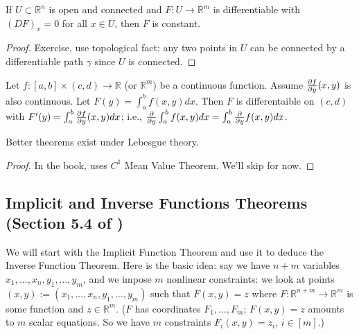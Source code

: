 \begin{theorem}

\end{theorem}

\begin{corollary}

If \(U \subset \mathbb{R}^n\) is open and connected and \(F: U \to \mathbb{R}^m\) is differentiable with \((DF)_x = 0\) for all \(x \in U\), then \(F\) is constant.

\end{corollary}

\begin{proof}

Exercise, use topological fact: any two points in \(U\) can be connected by a differentiable path \(\gamma\) since \(U\) is connected.

\end{proof}

\begin{theorem}

Let \(f: [a,b] \times (c,d) \to \mathbb{R}\) (or \(\mathbb{R}^m\)) be a continuous function. Assume \(\pderiv{f}{y}(x,y)\) is also continuous. Let \(F(y) = \int_a^b f(x,y) dx\). Then \(F\) is differentaible on \((c,d)\) with \(F'(y) = \int_a^b \pderiv{f}{y} (x,y) dx\); i.e., \(\pderiv{}{y} \int_a^b f(x,y) dx = \int_a^b \pderiv{}{y} f(x,y) dx\). 

\end{theorem}

\begin{remark}

Better theorems exist under Lebesgue theory.

\end{remark}

\begin{proof}

In the book, uses \(C^1\) Mean Value Theorem. We'll skip for now.

\end{proof}

\subsection{Implicit and Inverse Functions Theorems (Section 5.4 of \citet{pugh2015real})}\label{ra.5.4.pugh}

We will start with the Implicit Function Theorem and use it to deduce the Inverse Function Theorem. Here is the basic idea: say we have \(n + m\) variables \(x_1, \ldots, x_n, y_1, \ldots, y_m\), and we impose \(m\) nonlinear constraints: we look at points \((x,y) := (x_1, \ldots, x_n, y_1, \ldots, y_m)\) such that \(F(x,y) = z\) where \(F : \mathbb{R}^{n + m} \to \mathbb{R}^m\) is some function and \(z \in \mathbb{R}^m\). (\(F\) has coordinates \(F_1, \ldots, F_m\); \(F(x,y) = z\) amounts to \(m\) scalar equations. So we have \(m\) constraints \(F_i(x,y) = z_i\), \(i \in [m]\).)

